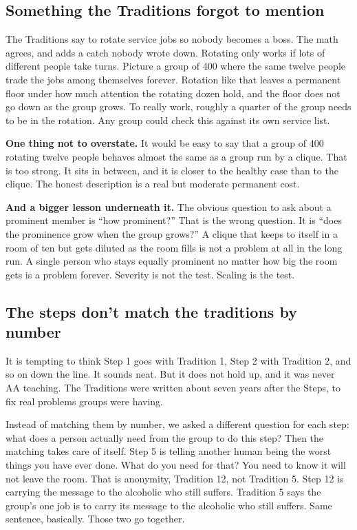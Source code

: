 \documentclass[11pt,a4paper]{article}
\begin{document}
\subsection{Something the Traditions forgot to mention}

The Traditions say to rotate service jobs so nobody becomes a boss. The math
agrees, and adds a catch nobody wrote down. Rotating only works if lots of
different people take turns. Picture a group of 400 where the same twelve people
trade the jobs among themselves forever. Rotation like that leaves a permanent
floor under how much attention the rotating dozen hold, and the floor does not go
down as the group grows. To really work, roughly a quarter of the group needs to
be in the rotation. Any group could check this against its own service list.

\textbf{One thing not to overstate.} It would be easy to say that a group of 400
rotating twelve people behaves almost the same as a group run by a clique. That is
too strong. It sits in between, and it is closer to the healthy case than to the
clique. The honest description is a real but moderate permanent cost.

\textbf{And a bigger lesson underneath it.} The obvious question to ask about a
prominent member is ``how prominent?'' That is the wrong question. It is ``does the prominence
grow when the group grows?'' A clique that keeps to itself in a room of ten but
gets diluted as the room fills is not a problem at all in the long run. A single
person who stays equally prominent no matter how big the room gets is a problem
forever. Severity is not the test. Scaling is the test.

\subsection{The steps don't match the traditions by number}

It is tempting to think Step 1 goes with Tradition 1, Step 2 with Tradition 2, and
so on down the line. It sounds neat. But it does not hold up, and it was never AA
teaching. The Traditions were written about seven years after the Steps, to fix real
problems groups were having.

Instead of matching them by number, we asked a different question for each step:
what does a person actually need from the group to do this step? Then the matching
takes care of itself. Step 5 is telling another human being the worst things you
have ever done. What do you need for that? You need to know it will not leave the
room. That is anonymity, Tradition 12, not Tradition 5. Step 12 is carrying the
message to the alcoholic who still suffers. Tradition 5 says the group's one job is
to carry its message to the alcoholic who still suffers. Same sentence, basically.
Those two go together.
\end{document}

